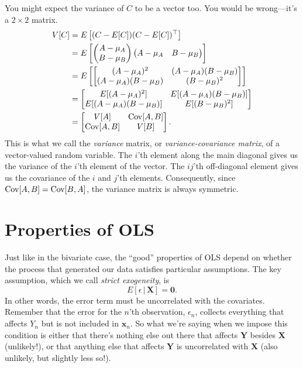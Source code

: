 \documentclass[12pt,oneside,openany]{book}
\begin{document}
You might expect the variance of \(C\) to be a vector too. You would be
wrong---it's a \(2 \times 2\) matrix. \[
\begin{aligned}
V[C]
&= E\left[(C - E[C]) (C - E[C])^\top \right] \\
&= E \left[
  \begin{pmatrix} A - \mu_A \\ B - \mu_B \end{pmatrix}
  \begin{pmatrix} A - \mu_A & B - \mu_B \end{pmatrix}
\right] \\
&= E \left[
  \begin{bmatrix}
  (A - \mu_A)^2 & (A - \mu_A) (B - \mu_B) \\
  (A - \mu_A) (B - \mu_B) & (B - \mu_B)^2
  \end{bmatrix}
\right] \\
&= \begin{bmatrix}
  E[(A - \mu_A)^2] & E[(A - \mu_A) (B - \mu_B)] \\
  E[(A - \mu_A) (B - \mu_B)] & E[(B - \mu_B)^2]
\end{bmatrix} \\
&= \begin{bmatrix}
  V[A] & \mathop{\rm Cov}\nolimits[A, B] \\
  \mathop{\rm Cov}\nolimits[A, B] & V[B]
\end{bmatrix}.
\end{aligned}
\] This is what we call the \emph{variance} matrix, or
\emph{variance-covariance matrix}, of a vector-valued random variable.
The \(i\)'th element along the main diagonal gives us the variance of
the \(i\)'th element of the vector. The \(ij\)'th off-diagonal element
gives us the covariance of the \(i\) and \(j\)'th elements.
Consequently, since \(\mathop{\rm Cov}\nolimits[A, B] = \mathop{\rm Cov}\nolimits[B, A]\), the variance matrix is
always symmetric.

\section{Properties of OLS}\label{properties-of-ols}

Just like in the bivariate case, the ``good'' properties of OLS depend
on whether the process that generated our data satisfies particular
assumptions. The key assumption, which we call \emph{strict exogeneity},
is \[
E[\epsilon \,|\, \mathbf{X}] = \mathbf{0}.
\] In other words, the error term must be uncorrelated with the
covariates. Remember that the error for the \(n\)'th observation,
\(\epsilon_n\), collects everything that affects \(Y_n\) but is not
included in \(\mathbf{x}_n\). So what we're saying when we impose this
condition is either that there's nothing else out there that affects
\(\mathbf{Y}\) besides \(\mathbf{X}\) (unlikely!), or that anything else
that affects \(\mathbf{Y}\) is uncorrelated with \(\mathbf{X}\) (also
unlikely, but slightly less so!).
\end{document}
